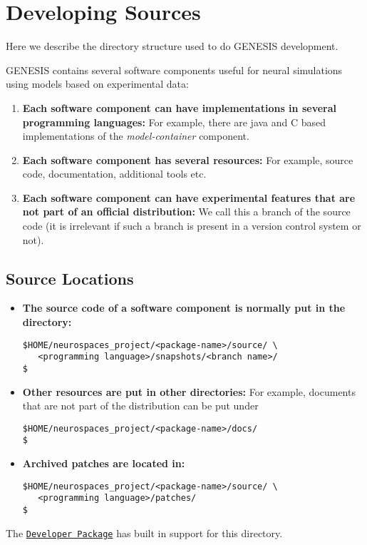 \documentclass[12pt]{article}
\begin{document}
\section*{Developing Sources}

Here we describe the directory structure used to do GENESIS development.

GENESIS contains several software components useful for neural simulations using models based on experimental data:
\begin{enumerate}
\item {\bf Each software component can have implementations in several programming languages:} For example, there are java and C based implementations of the {\it model-container} component.
\item {\bf Each software component has several resources:} For example, source code, documentation, additional tools etc.
\item {\bf Each software component can have experimental features that are not part of an official distribution:} We call this a branch of the source code (it is irrelevant if such a branch is present in a version control system or not). 
\end{enumerate}

\subsection*{Source Locations}

\begin{itemize}
\item {\bf The source code of a software component is normally put in the directory:}
\begin{verbatim}
$HOME/neurospaces_project/<package-name>/source/ \
   <programming language>/snapshots/<branch name>/
$
\end{verbatim}

\item {\bf Other resources are put in other directories:} For example, documents that are not part of the distribution can be put under
\begin{verbatim}
$HOME/neurospaces_project/<package-name>/docs/
$
\end{verbatim}

\item {\bf Archived patches are located in:}
\begin{verbatim}
$HOME/neurospaces_project/<package-name>/source/ \
   <programming language>/patches/ 
$
\end{verbatim}

\end{itemize}
The \href{../developer-package/developer-package.tex}{\tt Developer
  Package} has built in support for this directory.
\end{document}
